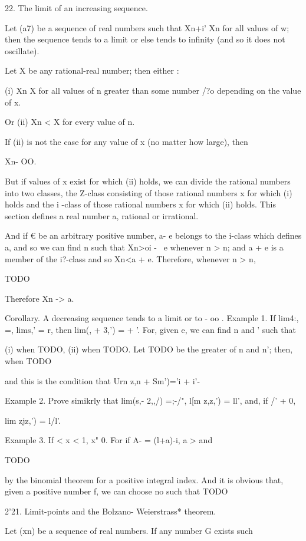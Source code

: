 %
%

22. The limit of an increasing sequence.

Let (a7) be a sequence of real numbers such that Xn+i' Xn for all
values of w; then the sequence tends to a limit or else tends to
infinity (and so it does not oscillate).

Let X be any rational-real number; then either :

(i) Xn X for all values of n greater than some number /?o depending on
the value of x.

Or (ii) Xn < X for every value of n.

If (ii) is not the case for any value of x (no matter how large), then

Xn- OO.

But if values of x exist for which (ii) holds, we can divide the
rational numbers into two classes, the Z-class consisting of those
rational numbers x for which (i) holds and the i -class of those
rational numbers x for which (ii) holds. This section defines a real
number a, rational or irrational.

And if € be an arbitrary positive number, a- e belongs to the i-class
which defines a, and so we can find n such that Xn>oi - \ e whenever n
> n; and a + e is a member of the i?-class and so Xn<a + e.
Therefore, whenever n > n,

TODO

Therefore Xn -> a.

Corollary. A decreasing sequence tends to a limit or to - oo . Example
1. If lim4:, =, lims,' = r, then lim(, + 3,') = + '. For, given
e, we can find n and ' such that

(i) when TODO, (ii) when TODO. Let TODO be the greater of n and n';
then, when TODO

and this is the condition that Urn z,n + Sm')='i + i'-

Example 2. Prove simikrly that lim(s,- 2,,/) =;-/", l[m z,z,') =
ll', and, if /' + 0,

lim zjz,') = l/l'.

Example 3. If < x < 1, x" 0. For if A- = (l+a)-i, a > and

TODO

by the binomial theorem for a positive integral index. And it is
obvious that, given a positive number f, we can choose no such that
TODO

2'21. Limit-points and the Bolzano- Weierstrass* theorem.

Let (xn) be a sequence of real numbers. If any number G exists such

